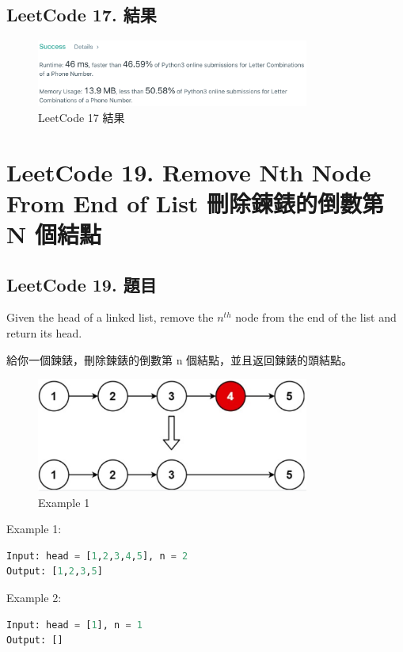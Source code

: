 \documentclass[10pt,UTF8]{ctexart}
\begin{document}
\subsection{LeetCode 17. 結果}

\begin{figure}[H]
\centering 
\includegraphics[width=0.80\textwidth]{lc-17-o.png} 
\caption{LeetCode 17 結果}
\label{Test}
\end{figure}


\newpage

\section{LeetCode 19. Remove Nth Node From End of List 刪除鍊錶的倒數第 N 個結點}

\subsection{LeetCode 19. 題目}

Given the head of a linked list, remove the $n^{th}$ node from the end of the list and return its head.

給你一個鍊錶，刪除鍊錶的倒數第 n 個結點，並且返回鍊錶的頭結點。

\begin{figure}[H]
\centering 
\includegraphics[width=0.80\textwidth]{lc-19-p-example.png} 
\caption{Example 1}
\label{Test}
\end{figure}

Example 1:
\begin{lstlisting}[language={python}]
Input: head = [1,2,3,4,5], n = 2
Output: [1,2,3,5]
\end{lstlisting}

Example 2:
\begin{lstlisting}[language={python}]
Input: head = [1], n = 1
Output: []
\end{lstlisting}
\end{document}
